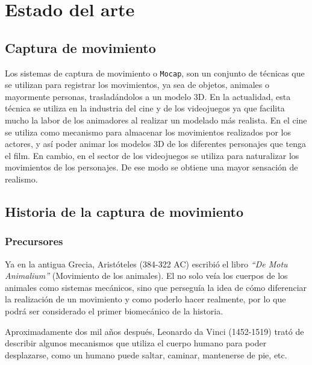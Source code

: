 
%
%



\chapter{Estado del arte}

\section{Captura de movimiento}
\label{cap3:sec:capitulo3}

Los sistemas de captura de movimiento o \texttt{Mocap}, son un conjunto de técnicas que se utilizan para registrar los movimientos, ya sea de objetos, animales o mayormente personas, trasladándolos a un modelo 3D.
En la actualidad, esta técnica se utiliza en la industria del cine y de los videojuegos ya que facilita mucho la labor de los animadores al realizar un modelado más realista. En el cine se utiliza como mecanismo para almacenar los movimientos realizados por los actores, y así poder animar los modelos 3D de los diferentes personajes que tenga el film. En cambio, en el sector de los videojuegos se utiliza para naturalizar los movimientos de los personajes. De ese modo se obtiene una mayor sensación de realismo.

\section{Historia de la captura de movimiento}

\subsection{Precursores}
Ya en la antigua Grecia, Aristóteles (384-322 AC) escribió el libro \textit{``De Motu Animalium''} (Movimiento de los animales). El no solo veía los cuerpos de los animales como sistemas mecánicos, sino que perseguía la idea de cómo diferenciar la realización de un movimiento y como poderlo hacer realmente, por lo que podrá ser considerado el primer biomecánico de la historia.

Aproximadamente dos mil años después, Leonardo da Vinci (1452-1519) trató de describir algunos mecanismos que utiliza el cuerpo humano para poder desplazarse, como un humano puede saltar, caminar, mantenerse de pie, etc.

